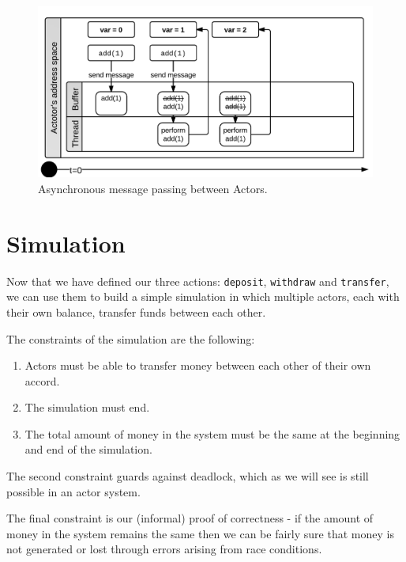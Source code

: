 \documentclass[a4paper,12pt]{kth-mag}
\begin{document}
\begin{figure}[H]
    \begin{center}
    \includegraphics{images/ActorsAdd.png}
    \end{center}
    \caption{Asynchronous message passing between Actors.}
    \label{fig:actorsAdd}
\end{figure}

\section{Simulation}

Now that we have defined our three actions: \texttt{deposit}, \texttt{withdraw} and \texttt{transfer}, we can use them to build a simple simulation in which multiple actors, each with their own balance, transfer funds between each other. 

The constraints of the simulation are the following:

\begin{enumerate}
\item Actors must be able to transfer money between each other of their own accord.
\item The simulation must end.
\item The total amount of money in the system must be the same at the beginning and end of the simulation.
\end{enumerate}

The second constraint guards against deadlock, which as we will see is still possible in an actor system.

The final constraint is our (informal) proof of correctness - if the amount of money in the system remains the same then we can be fairly sure that money is not generated or lost through errors arising from race conditions. \\
\end{document}

